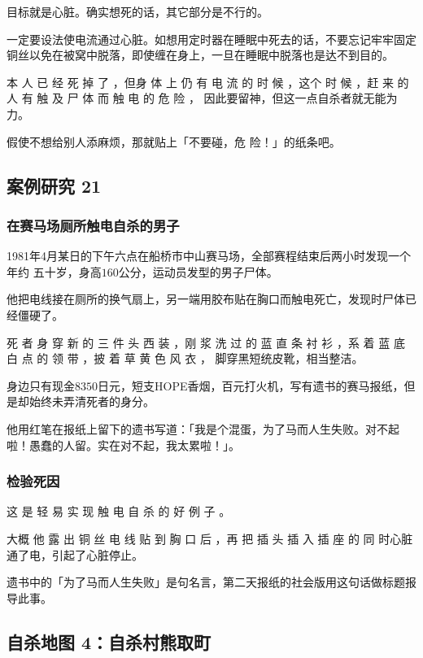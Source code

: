 \documentclass[UTF8]{ctexart}
\begin{document}
目标就是心脏。确实想死的话，其它部分是不行的。

一定要设法使电流通过心脏。如想用定时器在睡眠中死去的话，不要忘记牢牢固定铜丝以免在被窝中脱落，即使缠在身上，一旦在睡眠中脱落也是达不到目的。

本 人 已 经 死 掉 了 ，但身 体 上 仍 有 电 流 的 时 候 ，这个 时 候 ，赶 来 的 人 有 触 及 尸 体 而 触 电 的 危 险 ， 因此要留神，但这一点自杀者就无能为力。

假使不想给别人添麻烦，那就贴上「不要碰，危 险！」的纸条吧。




\subsection{案例研究 21}

\subsubsection*{在赛马场厕所触电自杀的男子}

1981年4月某日的下午六点在船桥市中山赛马场，全部赛程结束后两小时发现一个年约
五十岁，身高$160$公分，运动员发型的男子尸体。

他把电线接在厕所的换气扇上，另一端用胶布贴在胸口而触电死亡，发现时尸体已经僵硬了。

死 者 身 穿 新 的 三 件 头 西 装 ，刚 浆 洗 过 的 蓝 直 条 衬 衫 ，系 着 蓝 底 白 点 的 领 带 ，披 着 草 黄 色 风 衣 ， 脚穿黑短统皮靴，相当整洁。

身边只有现金$8350$日元，短支HOPE香烟，百元打火机，写有遗书的赛马报纸，但是却始终未弄清死者的身分。

他用红笔在报纸上留下的遗书写道：「我是个混蛋，为了马而人生失败。对不起啦！愚蠢的人留。实在对不起，我太累啦！」。

\subsubsection*{检验死因}

这 是 轻 易 实 现 触 电 自 杀 的 好 例 子 。

大概 他 露 出 铜 丝 电 线 贴 到 胸 口 后 ，再 把 插 头 插 入 插 座 的 同 时心脏通了电，引起了心脏停止。

遗书中的「为了马而人生失败」是句名言，第二天报纸的社会版用这句话做标题报导此事。


\subsection{自杀地图 4：自杀村熊取町}
\end{document}

